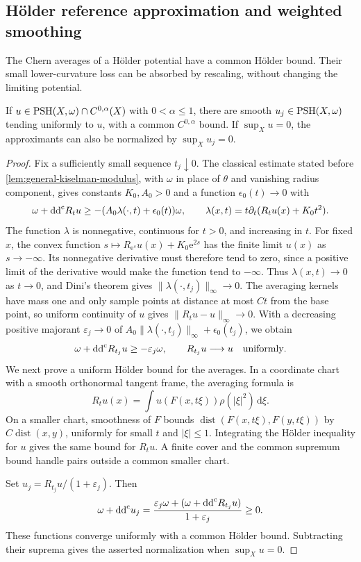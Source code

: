 \subsection{H\"older reference approximation and weighted smoothing}

The Chern averages of a H\"older potential have a common H\"older bound. Their small lower-curvature loss can be absorbed by rescaling, without changing the limiting potential.

\begin{lemma}\label{lem:smooth-holder-reference-approximation}
If $u\in\mathrm{PSH}(X,\omega)\cap C^{0,\alpha}(X)$ with $0<\alpha\leq1$, there are smooth $u_j\in\mathrm{PSH}(X,\omega)$ tending uniformly to $u$, with a common $C^{0,\alpha}$ bound. If $\sup_Xu=0$, the approximants can also be normalized by $\sup_Xu_j=0$.
\end{lemma}
\begin{proof}
Fix a sufficiently small sequence $t_j\downarrow0$. The classical estimate stated before \cref{lem:general-kiselman-modulus}, with $\omega$ in place of $\theta$ and vanishing radius component, gives constants $K_0,A_0>0$ and a function $\epsilon_0(t)\to0$ with
\[
 \omega+\mathrm{dd}^{\mathrm{c}} R_tu\geq-(A_0\lambda(\cdot,t)+\epsilon_0(t))\omega,
 \qquad \lambda(x,t)=t\partial_t(R_tu(x)+K_0t^2).
\]
The function $\lambda$ is nonnegative, continuous for $t>0$, and increasing in $t$. For fixed $x$, the convex function $s\mapsto R_{\mathrm{e}^s}u(x)+K_0\mathrm{e}^{2s}$ has the finite limit $u(x)$ as $s\to-\infty$. Its nonnegative derivative must therefore tend to zero, since a positive limit of the derivative would make the function tend to $-\infty$. Thus $\lambda(x,t)\to0$ as $t\to0$, and Dini's theorem gives $\|\lambda(\cdot,t_j)\|_\infty\to0$. The averaging kernels have mass one and only sample points at distance at most $Ct$ from the base point, so uniform continuity of $u$ gives $\|R_tu-u\|_\infty\to0$. With a decreasing positive majorant $\varepsilon_j\to0$ of $A_0\|\lambda(\cdot,t_j)\|_\infty+\epsilon_0(t_j)$, we obtain
\[
 \omega+\mathrm{dd}^{\mathrm{c}} R_{t_j}u\geq-\varepsilon_j\omega,
 \qquad R_{t_j}u\longrightarrow u\quad\text{uniformly}.
\]
We next prove a uniform H\"older bound for the averages. In a coordinate chart with a smooth orthonormal tangent frame, the averaging formula is
\[
 R_tu(x)=\int u(F(x,t\xi))\rho(|\xi|^2)\,\mathrm d\xi.
\]
On a smaller chart, smoothness of $F$ bounds $\operatorname{dist}(F(x,t\xi),F(y,t\xi))$ by $C\operatorname{dist}(x,y)$, uniformly for small $t$ and $|\xi|\leq1$. Integrating the H\"older inequality for $u$ gives the same bound for $R_tu$. A finite cover and the common supremum bound handle pairs outside a common smaller chart.

Set $u_j=R_{t_j}u/(1+\varepsilon_j)$. Then
\[
 \omega+\mathrm{dd}^{\mathrm{c}} u_j
 =\frac{\varepsilon_j\omega+(\omega+\mathrm{dd}^{\mathrm{c}} R_{t_j}u)}{1+\varepsilon_j}\geq0.
\]
These functions converge uniformly with a common H\"older bound. Subtracting their suprema gives the asserted normalization when $\sup_Xu=0$.
\end{proof}

